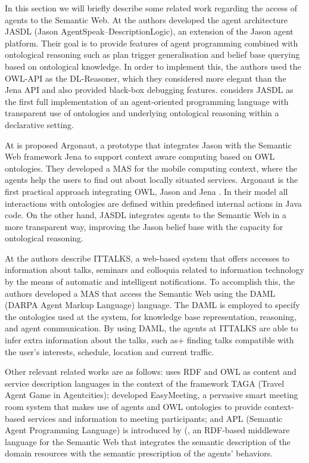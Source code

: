 \documentclass[a4paper,twoside]{article}
\begin{document}
\noindent In this section we will briefly describe some related work regarding the access of agents to the Semantic Web. At \cite{refB} the authors developed the agent architecture JASDL (Jason AgentSpeak–DescriptionLogic), an  extension of the Jason agent platform. Their goal is to provide features of agent programming combined with ontological reasoning such as plan trigger generalisation and belief base querying based on ontological knowledge. In order to implement this, the authors used the OWL-API as the DL-Reasoner, which they considered more elegant than the Jena API and also provided black-box debugging features. \cite{refB} considers JASDL as the first full implementation of an agent-oriented programming language with transparent use of ontologies and underlying ontological reasoning within a declarative setting.

At \cite{refC} is proposed Argonaut, a prototype that integrates Jason with the Semantic Web framework Jena to support context aware computing based on OWL ontologies. They developed a MAS for the mobile computing context, where the agents help the users to find out about locally situated services. Argonaut is the first practical approach integrating OWL, Jason and Jena \cite{refC}. In their model all interactions with ontologies are defined within predefined internal actions in Java code. On the other hand, JASDL integrates agents to the Semantic Web in a more transparent way, improving the Jason belief base with the capacity for ontological reasoning.

At \cite{refA} the authors describe ITTALKS, a web-based system that offers accesses to information about talks, seminars and colloquia related to information technology by the means of automatic and intelligent notifications. To accomplish this, the authors developed a MAS that access the Semantic Web using the DAML (DARPA Agent Markup Language) language. The DAML is employed to specify the ontologies used at the system, for knowledge base representation, reasoning, and agent communication. By using DAML, the agents at ITTALKS are able to infer extra information about the talks, such as+
 finding talks compatible with the user's interests, schedule, location and current traffic.

Other relevant related works are as follows: \cite{refD} uses RDF and OWL as content and service description languages in the context of the framework TAGA (Travel Agent Game in Agentcities); \cite{refE} developed EasyMeeting, a pervasive smart meeting room system that makes use of agents and OWL ontologies to provide context-based services and information to meeting participants; and 
APL (Semantic Agent Programming Language) is introduced by (\cite{refF}, an RDF-based middleware language for the Semantic Web that integrates the semantic description of the domain resources with the semantic prescription of the agents' behaviors.
\end{document}
